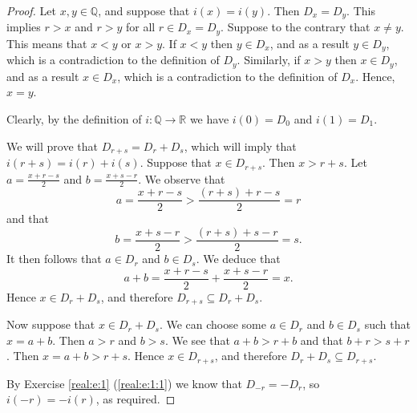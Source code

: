 \begin{proof}
	\hfill

	Let $x, y \in \mathbb{Q}$, and suppose that $i(x) = i(y)$. Then $D_x = D_y$. This implies $r > x$ and $r > y$ for all $r \in D_x = D_y$. Suppose to the contrary that $x \neq y$. This means that $x < y$ or $x > y$. If $x < y$ then $y \in D_x$, and as a result $y \in D_y$, which is a contradiction to the definition of $D_y$. Similarly, if $x > y$ then $x \in D_y$, and as a result $x \in D_x$, which is a contradiction to the definition of $D_x$. Hence, $x = y$.

	Clearly, by the definition of $i: \mathbb{Q} \to \mathbb{R}$ we have $i(0) = D_0$ and $i(1) = D_1$.

	We will prove that $D_{r + s} = D_r + D_s$, which will imply that $i(r + s) = i(r) + i(s)$. Suppose that $x \in D_{r + s}$. Then $x > r + s$. Let $a = \frac{x + r - s}{2}$ and $b = \frac{x + s -r}{2}$. We observe that
	$$
		a = \frac{x + r - s}{2} > \frac{(r + s) + r - s}{2} = r
	$$
	and that
	$$
		b = \frac{x + s - r}{2} > \frac{(r + s) + s - r}{2} = s.
	$$
	It then follows that $a \in D_r$ and $b \in D_s$. We deduce that
	$$
		a + b = \frac{x + r - s}{2} + \frac{x + s - r}{2} = x.
	$$
	Hence $x \in D_r + D_s$, and therefore $D_{r + s} \subseteq D_r + D_s$.

	Now suppose that $x \in D_r + D_s$. We can choose some $a \in D_r$ and $b \in D_s$ such that $x = a + b$. Then $a > r$ and $b > s$. We see that $a + b > r + b$ and that $b + r > s + r$. Then $x = a + b > r + s$. Hence $x \in D_{r + s}$, and therefore $D_r + D_s \subseteq D_{r + s}$.

	By Exercise \ref{real:e:1} (\ref{real:e:1:1}) we know that $D_{-r} = -D_r$, so $i(-r) = -i(r)$, as required.


\end{proof}
